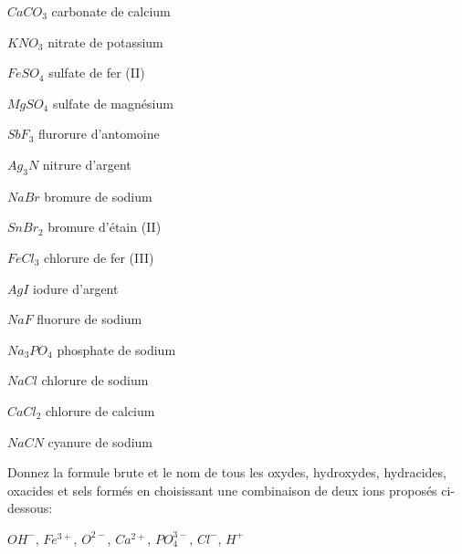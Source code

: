 \documentclass[
  11pt,
  a4paper,
  openany]{book}
\begin{document}
\begin{Answer}

\begin{multicols}{3}
\(CaCO_3\) carbonate de calcium

\(KNO_3\) nitrate de potassium

\(FeSO_4\) sulfate de fer (II)

\(MgSO_4\) sulfate de magnésium

\(SbF_3\) flurorure d'antomoine

\(Ag_3N\) nitrure d'argent

\(NaBr\) bromure de sodium

\(SnBr_2\) bromure d'étain (II)

\(FeCl_3\) chlorure de fer (III)

\(AgI\) iodure d'argent

\(NaF\) fluorure de sodium

\(Na_3PO_4\) phosphate de sodium

\(NaCl\) chlorure de sodium

\(CaCl_2\) chlorure de calcium

\(NaCN\) cyanure de sodium

\end{multicols}

\end{Answer}

\begin{Exercise}
Donnez la formule brute et le nom de tous les oxydes, hydroxydes, hydracides, oxacides et sels formés en choisissant une combinaison de deux ions proposés ci-dessous:

\(OH^-\), \(Fe^{3+}\), \(O^{2-}\), \(Ca^{2+}\), \(PO_4^{3-}\), \(Cl^-\), \(H^+\)

\end{Exercise}
\end{document}
